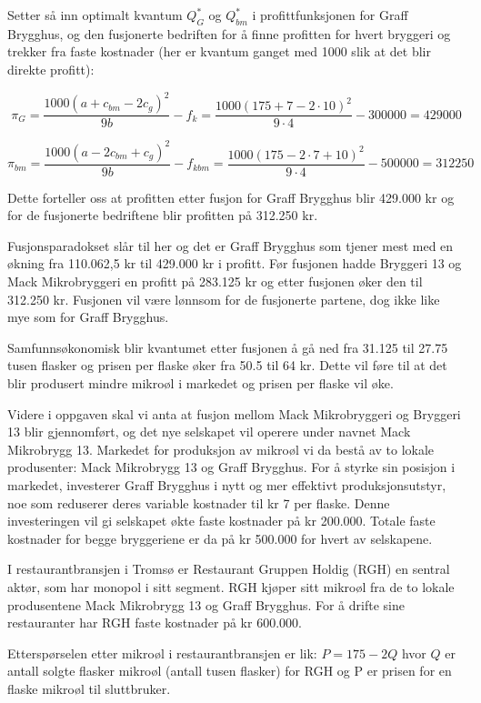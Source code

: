 \documentclass[
  12pt,
  a4paper,
  DIV=11,
  numbers=noendperiod]{scrartcl}
\begin{document}
Setter så inn optimalt kvantum \(Q_G^*\) og \(Q_{bm}^*\) i
profittfunksjonen for Graff Brygghus, og den fusjonerte bedriften for å
finne profitten for hvert bryggeri og trekker fra faste kostnader (her
er kvantum ganget med 1000 slik at det blir direkte profitt):

\[ \pi_G = \frac{1000(a+c_{bm}-2c_g)^2}{9b} -f_k = \frac{1000(175+7 - 2 \cdot 10)^2}{9 \cdot 4} -300000 = 429000 \tag{35}\]

\[ \pi_{bm} = \frac{1000(a-2c_{bm}+c_g)^2}{9b} -f_{kbm} = \frac{1000(175-2 \cdot 7+10)^2}{9 \cdot 4} -500000 = 312250 \tag{36}\]

Dette forteller oss at profitten etter fusjon for Graff Brygghus blir
429.000 kr og for de fusjonerte bedriftene blir profitten på 312.250 kr.

Fusjonsparadokset slår til her og det er Graff Brygghus som tjener mest
med en økning fra 110.062,5 kr til 429.000 kr i profitt. Før fusjonen
hadde Bryggeri 13 og Mack Mikrobryggeri en profitt på 283.125 kr og
etter fusjonen øker den til 312.250 kr. Fusjonen vil være lønnsom for de
fusjonerte partene, dog ikke like mye som for Graff Brygghus.

Samfunnsøkonomisk blir kvantumet etter fusjonen å gå ned fra 31.125 til
27.75 tusen flasker og prisen per flaske øker fra 50.5 til 64 kr. Dette
vil føre til at det blir produsert mindre mikroøl i markedet og prisen
per flaske vil øke.

Videre i oppgaven skal vi anta at fusjon mellom Mack Mikrobryggeri og
Bryggeri 13 blir gjennomført, og det nye selskapet vil operere under
navnet Mack Mikrobrygg 13. Markedet for produksjon av mikroøl vi da
bestå av to lokale produsenter: Mack Mikrobrygg 13 og Graff Brygghus.
For å styrke sin posisjon i markedet, investerer Graff Brygghus i nytt
og mer effektivt produksjonsutstyr, noe som reduserer deres variable
kostnader til kr 7 per flaske. Denne investeringen vil gi selskapet økte
faste kostnader på kr 200.000. Totale faste kostnader for begge
bryggeriene er da på kr 500.000 for hvert av selskapene.

I restaurantbransjen i Tromsø er Restaurant Gruppen Holdig (RGH) en
sentral aktør, som har monopol i sitt segment. RGH kjøper sitt mikroøl
fra de to lokale produsentene Mack Mikrobrygg 13 og Graff Brygghus. For
å drifte sine restauranter har RGH faste kostnader på kr 600.000.

Etterspørselen etter mikroøl i restaurantbransjen er lik:
\(P = 175 − 2Q\) hvor \(Q\) er antall solgte flasker mikroøl (antall
tusen flasker) for RGH og P er prisen for en flaske mikroøl til
sluttbruker.
\end{document}
